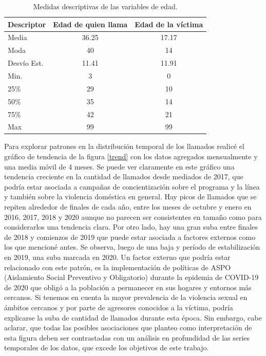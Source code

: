 \documentclass[10 pt]{article}
\begin{document}
    \begin{table}[H]
    \centering    
    \small
    \caption{Medidas descriptivas de las variables de edad.}
    \label{tabla_descr_ed}
        \begin{tabular}{lcc}    
        \hline
        \textbf{Descriptor} & \textbf{Edad de quien llama} & \textbf{Edad de la víctima} \\ \hline
        Media               & 36.25                        & 17.17                       \\
        Moda                & 40                           & 14                          \\
        Desvío Est.     & 11.41                        & 11.91                       \\
        Min.                & 3                            & 0                           \\
        25\%                & 29                           & 10                          \\
        50\%                & 35                           & 14                          \\
        75\%                & 42                           & 21                          \\
        Max                 & 99                           & 99                          \\ \hline
        \end{tabular}
        \end{table}


Para explorar patrones en la distribución temporal de los llamados realicé el gráfico de tendencia de la figura \ref{trend} con los datos agregados mensualmente y una media móvil de 4 meses. Se puede ver claramente en este gráfico una tendencia creciente en la cantidad de llamados desde mediados de 2017, que podría estar asociada a campañas de concientización sobre el programa y la línea y también sobre la violencia doméstica en general. Hay picos de llamados que se repiten alrededor de finales de cada año, entre los meses de octubre y enero en 2016, 2017, 2018 y 2020 aunque no parecen ser consistentes en tamaño como para considerarlos una tendencia clara. Por otro lado, hay una gran suba entre finales de 2018 y comienzos de 2019 que puede estar asociada a factores externos como los que mencioné antes. Se observa, luego de una baja y período de estabilización en 2019, una suba marcada en 2020. Un factor externo que podría estar relacionado con este patrón, es la implementación de políticas de ASPO (Aislamiento Social Preventivo y Obligatorio) durante la epidemia de COVID-19 de 2020 que obligó a la población a permanecer en sus hogares y entornos más cercanos. Si tenemos en cuenta la mayor prevalencia de la violencia sexual en ámbitos cercanos y por parte de agresores conocidos a la víctima, podría explicarse la suba de cantidad de llamados durante esta época. Sin embargo, cabe aclarar, que todas las posibles asociaciones que planteo como interpretación de esta figura deben ser contrastadas con un análisis en profundidad de las series temporales de los datos, que excede los objetivos de este trabajo.
\end{document}
